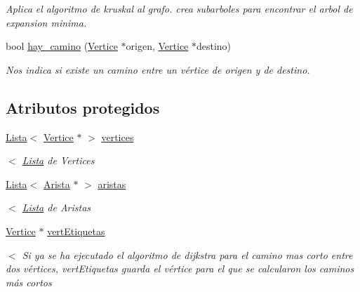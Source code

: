\begin{DoxyCompactItemize}
\begin{DoxyCompactList}\small\item\em Aplica el algoritmo de kruskal al grafo. crea subarboles para encontrar el arbol de expansion minima. \end{DoxyCompactList}\item 
bool \hyperlink{classGrafo_a24cc1dad8b719978e5fcba8b0950c3f5}{hay\+\_\+camino} (\hyperlink{classVertice}{Vertice} $\ast$origen, \hyperlink{classVertice}{Vertice} $\ast$destino)
\begin{DoxyCompactList}\small\item\em Nos indica si existe un camino entre un vértice de origen y de destino. \end{DoxyCompactList}\end{DoxyCompactItemize}
\subsection*{Atributos protegidos}
\begin{DoxyCompactItemize}
\item 
\mbox{\label{classGrafo_af6719d649fae513eb84ef8bf502c1812}} 
\hyperlink{classLista}{Lista}$<$ \hyperlink{classVertice}{Vertice} $\ast$ $>$ \hyperlink{classGrafo_af6719d649fae513eb84ef8bf502c1812}{vertices}
\begin{DoxyCompactList}\small\item\em $<$ \hyperlink{classLista}{Lista} de Vertices \end{DoxyCompactList}\item 
\mbox{\label{classGrafo_a69300beee0528e08e810d91b6f968d02}} 
\hyperlink{classLista}{Lista}$<$ \hyperlink{classArista}{Arista} $\ast$ $>$ \hyperlink{classGrafo_a69300beee0528e08e810d91b6f968d02}{aristas}
\begin{DoxyCompactList}\small\item\em $<$ \hyperlink{classLista}{Lista} de Aristas \end{DoxyCompactList}\item 
\mbox{\label{classGrafo_a67e71aebff46a360d82771b825f71263}} 
\hyperlink{classVertice}{Vertice} $\ast$ \hyperlink{classGrafo_a67e71aebff46a360d82771b825f71263}{vert\+Etiquetas}
\begin{DoxyCompactList}\small\item\em $<$ Si ya se ha ejecutado el algoritmo de dijkstra para el camino mas corto entre dos vértices, \textquotesingle{}vert\+Etiquetas\textquotesingle{} guarda el vértice para el que se calcularon los caminos más cortos \end{DoxyCompactList}\end{DoxyCompactItemize}


